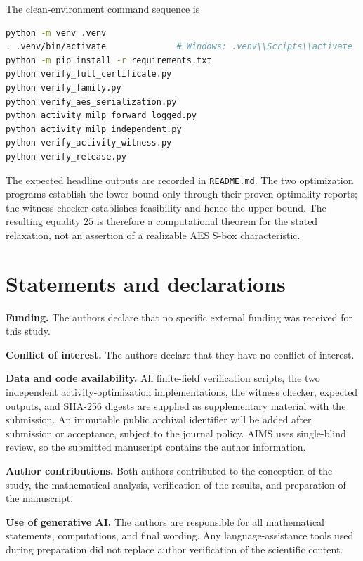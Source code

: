 \documentclass[10pt,reqno]{amsart}
\theoremstyle{plain}
\theoremstyle{remark}\newtheorem{remark}[theorem]{Remark}
\theoremstyle{definition}\newtheorem{definition}[theorem]{Definition}
\begin{document}
The clean-environment command sequence is
\begin{lstlisting}[language=bash,basicstyle=\ttfamily\scriptsize]
python -m venv .venv
. .venv/bin/activate              # Windows: .venv\\Scripts\\activate
python -m pip install -r requirements.txt
python verify_full_certificate.py
python verify_family.py
python verify_aes_serialization.py
python activity_milp_forward_logged.py
python activity_milp_independent.py
python verify_activity_witness.py
python verify_release.py
\end{lstlisting}
The expected headline outputs are recorded in \texttt{README.md}.  The two optimization programs establish the lower bound only through their proven optimality reports; the witness checker establishes feasibility and hence the upper bound.  The resulting equality $25$ is therefore a computational theorem for the stated relaxation, not an assertion of a realizable AES S-box characteristic.

\section*{Statements and declarations}
\textbf{Funding.} The authors declare that no specific external funding was received for this study.

\textbf{Conflict of interest.} The authors declare that they have no conflict of interest.

\textbf{Data and code availability.} All finite-field verification scripts, the two independent activity-optimization implementations, the witness checker, expected outputs, and SHA-256 digests are supplied as supplementary material with the submission. An immutable public archival identifier will be added after submission or acceptance, subject to the journal policy. AIMS uses single-blind review, so the submitted manuscript contains the author information.

\textbf{Author contributions.} Both authors contributed to the conception of the study, the mathematical analysis, verification of the results, and preparation of the manuscript.

\textbf{Use of generative AI.} The authors are responsible for all mathematical statements, computations, and final wording. Any language-assistance tools used during preparation did not replace author verification of the scientific content.
\end{document}
